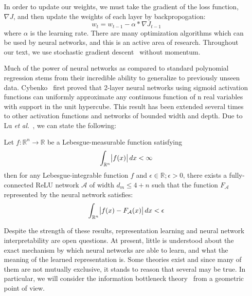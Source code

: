 In order to update our weights, we must take the gradient of the loss function, $\nabla J$, and then update the weights of each layer by backpropogation: 
\begin{equation}
w_t = w_{t-1} - \alpha * \nabla J_{t-1}
\end{equation}
where $\alpha$ is the learning rate.
There are many optimization algorithms which can be used by neural networks, and this is an active area of research.
Throughout our text, we use stochastic gradient descent~\cite{hastie01statisticallearning} without momentum.

Much of the power of neural networks as compared to standard polynomial regression stems from their incredible ability to generalize to previously unseen data.
Cybenko~\cite{cybenko1989approximation} first proved that 2-layer neural networks using sigmoid activation functions can uniformly approximate any continuous function of n real variables with support in the unit hypercube.
This result has been extended several times to other activation functions and networks of bounded width and depth. 
Due to Lu \textit{et al.}~\cite{lu2017expressive}, we can state the following:

\begin{theorem}
Let $f: \mathbb{R}^n \to \mathbb{R}$ be a Lebesgue-measurable function satisfying
$$\int_{\mathbb{R}^n} \abs{f(x)} dx < \infty$$
then for any Lebesgue-integrable function $f$ and $\epsilon \in \mathbb{R}; \epsilon > 0$, there exists a fully-connected ReLU network $\mathcal{A}$ of width $d_m \leq 4 + n$ such that the function $F_{\mathcal{A}}$ represented by the neural network satisfies:
$$\int_{\mathbb{R}^n} \abs{f(x) - F_{\mathcal{A}}(x)}dx < \epsilon$$
\end{theorem}

Despite the strength of these results, representation learning and neural network interpretability are open questions.
At present, little is understood about the exact mechanism by which neural networks are able to learn, and what the meaning of the learned representation is.
Some theories exist and since many of them are not mutually exclusive, it stands to reason that several may be true.
In particular, we will consider the information bottleneck theory~\cite{tishby2015deep, fischer2020conditional} from a geometric point of view.

